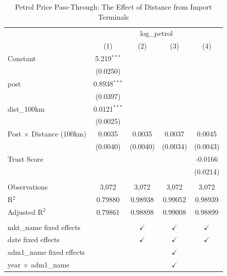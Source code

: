 
\begin{table}[htbp]
   \caption{\label{tab:main} Petrol Price Pass-Through: The Effect of Distance from Import Terminals}
   \bigskip
   \centering
   \begin{tabular}{lcccc}
      \toprule
       & \multicolumn{4}{c}{log\_petrol}\\
                                      & (1)            & (2)           & (3)           & (4)\\  
      \midrule 
      Constant                        & 5.219$^{***}$  &               &               &   \\   
                                      & (0.0250)       &               &               &   \\   
      post                            & 0.8938$^{***}$ &               &               &   \\   
                                      & (0.0397)       &               &               &   \\   
      dist\_100km                     & 0.0121$^{***}$ &               &               &   \\   
                                      & (0.0025)       &               &               &   \\   
      Post $\times$ Distance (100km)  & 0.0035         & 0.0035        & 0.0037        & 0.0045\\   
                                      & (0.0040)       & (0.0040)      & (0.0034)      & (0.0043)\\   
      Trust Score                     &                &               &               & -0.0166\\   
                                      &                &               &               & (0.0214)\\   
       \\
      Observations                    & 3,072          & 3,072         & 3,072         & 3,072\\  
      R$^2$                           & 0.79880        & 0.98938       & 0.99052       & 0.98939\\  
      Adjusted R$^2$                  & 0.79861        & 0.98898       & 0.99008       & 0.98899\\  
       \\
      mkt\_name fixed effects         &                & $\checkmark$  & $\checkmark$  & $\checkmark$\\   
      date fixed effects              &                & $\checkmark$  & $\checkmark$  & $\checkmark$\\   
      adm1\_name fixed effects        &                &               & $\checkmark$  & \\  
      year $\times $ adm1\_name       &                &               & $\checkmark$  & \\  
      \bottomrule
   \end{tabular}
   

\end{table}
